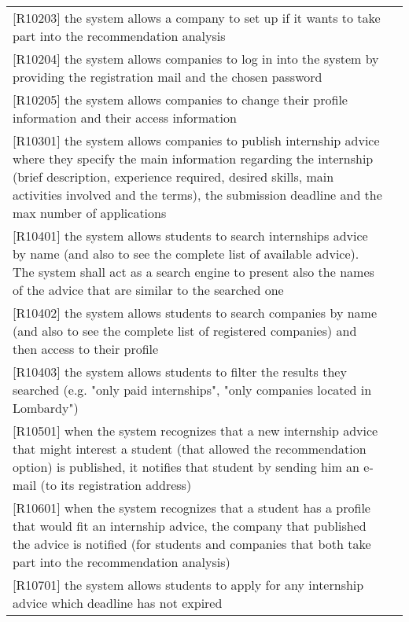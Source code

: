 \begin{table} [h!]
\begin{tabular}{ || P{7.5cm} P{7.5cm} || }
					[R10203] the system allows a company to set up if it wants to take part into the recommendation analysis & \\
					
					[R10204] the system allows companies to log in into the system by providing the registration mail and the chosen password & \\
					
					[R10205] the system allows companies to change their profile information and their access information & \\
					
					[R10301] the system allows companies to publish internship advice where they specify the main information regarding the internship (brief description, experience required, desired skills, main activities involved and the terms), the submission deadline and the max number of applications & \\
					
					[R10401] the system allows students to search internships advice by name (and also to see the complete list of available advice). The system shall act as a search engine to present also the names of the advice that are similar to the searched one & \\
					
					[R10402] the system allows students to search companies by name (and also to see the complete list of registered companies) and then access to their profile & \\
					
					[R10403] the system allows students to filter the results they searched (e.g. "only paid internships", "only companies located in Lombardy") & \\
					
					[R10501] when the system recognizes that a new internship advice that might interest a student (that allowed the recommendation option) is published, it notifies that student by sending him an e-mail (to its registration address) & \\
					
					[R10601] when the system recognizes that a student has a profile that would fit an internship advice, the company that published the advice is notified (for students and companies that both take part into the recommendation analysis) & \\
					
					[R10701] the system allows students to apply for any internship advice which deadline has not expired & \\
					

\end{tabular}
\end{table}
